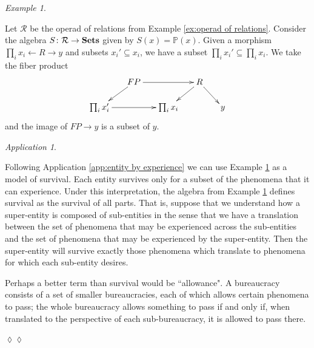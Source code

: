\documentclass{book}
\def\mc{\mathcal}
\def\PP{{\mathbb P}}
\def\to{\rightarrow}
\def\from{\leftarrow}
\def\taking{\colon}
\def\ss{\subseteq}
\def\Sets{{\bf Sets}}
\def\mcR{\mc{R}}
\theoremstyle{remark}
\newtheorem{example}[subsubsection]{Example}
\newtheorem{app}[subsubsection]{Application}
\newenvironment{application}{\begin{app}}{\hspace*{\fill}$\lozenge\lozenge$\end{app}}
\theoremstyle{definition}
\begin{document}
\begin{example}\label{ex:algebra on operad of rels}

Let $\mcR$ be the operad of relations from Example \ref{ex:operad of relations}. Consider the algebra $S\taking\mcR\to\Sets$ given by $S(x)=\PP(x)$. Given a morphism $\prod_ix_i\from R\to y$ and subsets $x_i'\ss x_i$, we have a subset $\prod_ix_i'\ss\prod_ix_i$. We take the fiber product
$$\xymatrix@=15pt{&FP\ar[rr]\ar[ld]&&R\ar[ld]\ar[rd]\\\prod_ix_i'\ar[rr]&&\prod_ix_i&&y}$$
and the image of $FP\to y$ is a subset of $y$. 

\end{example}

\begin{application}\label{app:desire}

Following Application \ref{app:entity by experience} we can use Example \ref{ex:algebra on operad of rels} as a model of survival. Each entity survives only for a subset of the phenomena that it can experience. Under this interpretation, the algebra from Example \ref{ex:algebra on operad of rels} defines survival as the survival of all parts. That is, suppose that we understand how a super-entity is composed of sub-entities in the sense that we have a translation between the set of phenomena that may be experienced across the sub-entities and the set of phenomena that may be experienced by the super-entity. Then the super-entity will survive exactly those phenomena which translate to phenomena for which each sub-entity desires. 

Perhaps a better term than survival would be ``allowance". A bureaucracy consists of a set of smaller bureaucracies, each of which allows certain phenomena to pass; the whole bureaucracy allows something to pass if and only if, when translated to the perspective of each sub-bureaucracy, it is allowed to pass there.

\end{application}
\end{document}
